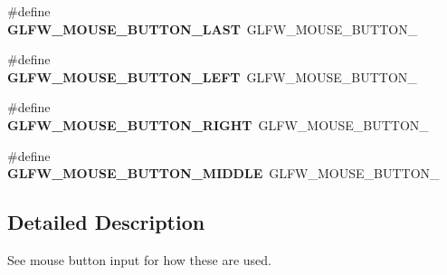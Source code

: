 \begin{DoxyCompactItemize}
\item 
\hypertarget{group__buttons_gab1fd86a4518a9141ec7bcde2e15a2fdf}{}\#define {\bfseries G\+L\+F\+W\+\_\+\+M\+O\+U\+S\+E\+\_\+\+B\+U\+T\+T\+O\+N\+\_\+\+L\+A\+S\+T}~G\+L\+F\+W\+\_\+\+M\+O\+U\+S\+E\+\_\+\+B\+U\+T\+T\+O\+N\+\_\label{group__buttons_gab1fd86a4518a9141ec7bcde2e15a2fdf}

\item 
\hypertarget{group__buttons_gaf37100431dcd5082d48f95ee8bc8cd56}{}\#define {\bfseries G\+L\+F\+W\+\_\+\+M\+O\+U\+S\+E\+\_\+\+B\+U\+T\+T\+O\+N\+\_\+\+L\+E\+F\+T}~G\+L\+F\+W\+\_\+\+M\+O\+U\+S\+E\+\_\+\+B\+U\+T\+T\+O\+N\+\_\label{group__buttons_gaf37100431dcd5082d48f95ee8bc8cd56}

\item 
\hypertarget{group__buttons_ga3e2f2cf3c4942df73cc094247d275e74}{}\#define {\bfseries G\+L\+F\+W\+\_\+\+M\+O\+U\+S\+E\+\_\+\+B\+U\+T\+T\+O\+N\+\_\+\+R\+I\+G\+H\+T}~G\+L\+F\+W\+\_\+\+M\+O\+U\+S\+E\+\_\+\+B\+U\+T\+T\+O\+N\+\_\label{group__buttons_ga3e2f2cf3c4942df73cc094247d275e74}

\item 
\hypertarget{group__buttons_ga34a4d2a701434f763fd93a2ff842b95a}{}\#define {\bfseries G\+L\+F\+W\+\_\+\+M\+O\+U\+S\+E\+\_\+\+B\+U\+T\+T\+O\+N\+\_\+\+M\+I\+D\+D\+L\+E}~G\+L\+F\+W\+\_\+\+M\+O\+U\+S\+E\+\_\+\+B\+U\+T\+T\+O\+N\+\_\label{group__buttons_ga34a4d2a701434f763fd93a2ff842b95a}

\end{DoxyCompactItemize}


\subsection{Detailed Description}
See mouse button input for how these are used. 